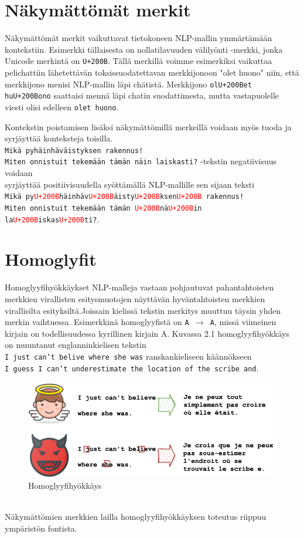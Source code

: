 \section{Näkymättömät merkit}
Näkymättömät merkit vaikuttavat tietokoneen NLP-mallin ymmärtämään kontekstiin. Esimerkki tällaisesta on nollatilavuuden välilyönti -merkki, jonka Unicode merkintä on \texttt{U+200B}. Tällä merkillä voimme esimerkiksi vaikuttaa pelichattiin lähetettävän toksissuodatettavan merkkijonoon "olet huono" niin, että merkkijono menisi NLP-mallin läpi chätistä. Merkkijono \texttt{olU+200Bet huU+200Bono} saattaisi mennä läpi chatin suodattimesta, mutta vastapuolelle viesti olisi edelleen \texttt{olet huono}.

Kontekstin poistamisen lisäksi näkymättömillä merkeillä voidaan myös tuoda ja syrjäyttää konteksteja toisilla.\\
\texttt{Mikä pyhäinhäväistyksen rakennus!\\
  Miten onnistuit tekemään tämän näin laiskasti?} -tekstin negatiivisuus voidaan\\
syrjäyttää positiivisuudella syöttämällä NLP-mallille sen sijaan teksti \\
\texttt{Mikä py\textcolor{red}{U+200B}häinhäv\textcolor{red}{U+200B}äisty\textcolor{red}{U+200B}ksen\textcolor{red}{U+200B} rakennus!\\
  Miten onnistuit tekemään tämän \textcolor{red}{U+200B}nä\textcolor{red}{U+200B}in la\textcolor{red}{U+200B}iskas\textcolor{red}{U+200B}ti?}.

\section{Homoglyfit}
Homoglyyfihyökkäykset NLP-malleja vastaan pohjautuvat pahantahtoisten merkkien virallisten esitysmuotojen näyttävän hyväntahtoisten merkkien virallisilta esityksiltä.Jois\-sain kielissä tekstin merkitys muuttuu täysin yhden merkin vaihtuessa. Esimerkkinä homoglyyfistä on \texttt{A $\rightarrow$ A}, missä viimeinen kirjain on todellisuudessa kyrillinen kirjain A. Kuvassa 2.1 homoglyyfihyökkäys on muuntanut englanninkielisen tekstin\\ \texttt{I just can't belive where she was} ranskankieliseen käännökseen\\ \texttt{I guess I can't underestimate the location of the scribe and}.
\begin{figure}[t]
  \includegraphics[scale=0.5]{figures/homoglyph.png}
  \caption{Homoglyyfihyökkäys \citep{boucher2021bad}}
\end{figure}
\\Näkymättömien merkkien lailla homoglyyfihyökkäyksen toteutus riippuu ympäristön fontista.



